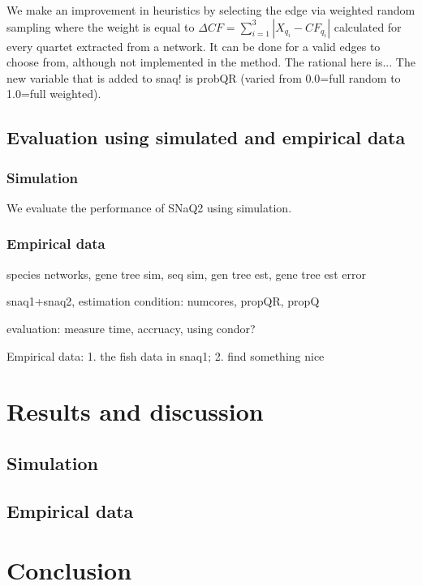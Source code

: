 \documentclass[unnumsec,webpdf,contemporary,large]{oup-authoring-template}%
\theoremstyle{thmstyleone}%
\theoremstyle{thmstyletwo}%
\theoremstyle{thmstylethree}%
\begin{document}
We make an improvement in heuristics by selecting the edge via weighted random sampling where the weight is equal to $\Delta CF=\sum^3_{i=1}\left|X_{q_i}-CF_{q_i}\right|$ calculated for every quartet extracted from a network. It can be done for a valid edges to choose from, although not implemented in the method. The rational here is... The new variable that is added to snaq! is probQR (varied from 0.0=full random to 1.0=full weighted).






\subsection{Evaluation using simulated and empirical data}\label{subsec3}
\subsubsection{Simulation}
We evaluate the performance of SNaQ2 using simulation. 



\subsubsection{Empirical data}



species networks, gene tree sim, seq sim, gen tree est, gene tree est error 

snaq1+snaq2, estimation condition: numcores, propQR, propQ

evaluation: measure time, accruacy, using condor?

Empirical data: 1. the fish data in snaq1; 2. find something nice

\section{Results and discussion}\label{sec3}
\subsection{Simulation}\label{subsec4}
\subsection{Empirical data}\label{subsec5}

\section{Conclusion}\label{sec4}
\end{document}
